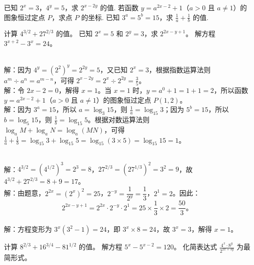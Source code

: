 \documentclass{ctexart}
\newenvironment{MyAnswer}[1][] %
{
    \begin{tcolorbox}[breakable, colframe=blue]
    \begin{Answer}[#1] \color{blue} \kaishu
        }  %
    {\end{Answer}
\end{tcolorbox}
}
\begin{document}
\begin{Exercise}[title={指数运算小练习}, label={ex:exponent}]
    \Question 已知 $2^x = 3$，$4^y = 5$，求 $2^{x - 2y}$ 的值.
    \Question 若函数 $y = a^{2x - 2}+1$（$a>0$ 且 $a\neq1$）的图象恒过定点 $P$，求点 $P$ 的坐标.
    \Question 已知 $3^a = 5^b = 15$，求 $\frac{1}{a}+\frac{1}{b}$ 的值.

    \Question 计算 $4^{3/2} + 27^{2/3}$ 的值。
    \Question 已知 $2^x = 5$ 和 $2^y = 3$，求 $2^{2x - y + 1}$。
    \Question 解方程 $3^{x+2} - 3^x = 24$。
\end{Exercise}

\begin{MyAnswer}[ref={ex:exponent}]
    \Question {}\\ 解：因为 $4^y=(2^2)^y = 2^{2y}=5$，又已知 $2^x = 3$，根据指数运算法则 $a^m\div a^n=a^{m - n}$，可得 $2^{x - 2y}=2^x\div2^{2y}=\frac{3}{5}$。
    \Question {}\\ 解：令 $2x - 2 = 0$，解得 $x = 1$。当 $x = 1$ 时，$y=a^{0}+1=1 + 1=2$，所以函数 $y = a^{2x - 2}+1$（$a>0$ 且 $a\neq1$）的图象恒过定点 $P(1,2)$。
    \Question {}\\ 解：因为 $3^a = 15$，所以 $a=\log_3{15}$，则 $\frac{1}{a}=\log_{15}3$；因为 $5^b = 15$，所以 $b=\log_5{15}$，则 $\frac{1}{b}=\log_{15}5$。根据对数运算法则 $\log_aM+\log_aN=\log_a(MN)$，可得 $\frac{1}{a}+\frac{1}{b}=\log_{15}3+\log_{15}5=\log_{15}(3\times5)=\log_{15}15 = 1$。

    \Question {}\\ 解：$4^{3/2} = (4^{1/2})^3 = 2^3 = 8$，$27^{2/3} = (27^{1/3})^2 = 3^2 = 9$，故 $4^{3/2} + 27^{2/3} = 8 + 9 = 17$。
    \Question {}\\ 解：由题意，$2^{2x} = (2^x)^2 = 25$，$2^{-y} = \dfrac{1}{2^y} = \dfrac{1}{3}$，$2^1 = 2$。因此：
    $$
    2^{2x - y + 1} = 2^{2x} \cdot 2^{-y} \cdot 2^1 = 25 \times \dfrac{1}{3} \times 2 = \dfrac{50}{3} 。
    $$
    \Question {}\\ 解：方程变形为 $3^x (3^2 - 1) = 24$，即 $3^x \times 8 = 24$，故 $3^x = 3$，解得 $x = 1$。
\end{MyAnswer}

\begin{Exercise}[title={指数运算小练习2}, label={ex:exponent2}]
    \Question 计算 $8^{2/3} + 16^{3/4} - 81^{1/2}$ 的值。
    \Question 解方程 $5^{x} - 5^{x-2} = 120$。
    \Question 化简表达式 $\frac{4^{x} \cdot 8^{y}}{2^{2x + 3y}}$ 为最简形式。
\end{Exercise}
\end{document}
